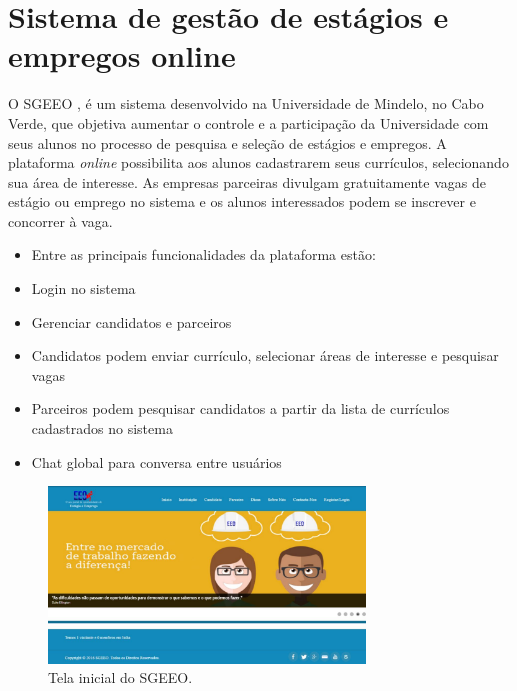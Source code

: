 \documentclass[cic,tc]{iiufrgs}
\begin{document}
\section{Sistema de gestão de estágios e empregos online}
\label{trabRelSistEmprego}

O SGEEO \cite{SGEEOMono} , é um sistema desenvolvido na Universidade de Mindelo, no Cabo Verde, que objetiva aumentar o controle e a participação da Universidade com seus alunos no processo de pesquisa e seleção de estágios e empregos. A plataforma \textit{online} possibilita aos alunos cadastrarem seus currículos, selecionando sua área de interesse. As empresas parceiras divulgam gratuitamente vagas de estágio ou emprego no sistema e os alunos interessados podem se inscrever e concorrer à vaga.

\begin{itemize}
    \item Entre as principais funcionalidades da plataforma estão:
    \item Login no sistema
    \item Gerenciar candidatos e parceiros
    \item Candidatos podem enviar currículo, selecionar áreas de interesse e pesquisar vagas
    \item Parceiros podem pesquisar candidatos a partir da lista de currículos cadastrados no sistema
    \item Chat global para conversa entre usuários
\end{itemize}

\begin{figure}[h]
    \caption{Tela inicial do SGEEO.}
        \begin{center}
            \includegraphics[width=0.75\textwidth]{figuras/rel01.png}
        \end{center}
    \label{telaHomeSGEEO}
\end{figure}
\end{document}

